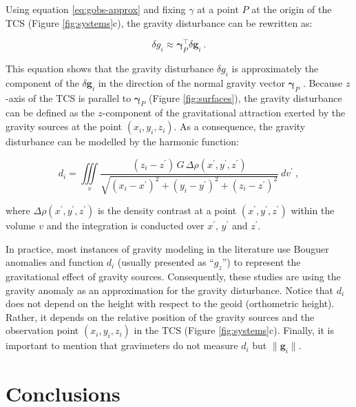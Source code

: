 \documentclass[manuscript]{geophysics}
\begin{document}
Using equation \ref{eq:gobs-approx} and fixing $\gamma$ at a point $P$ at
the origin of the TCS (Figure \ref{fig:systems}c),
the gravity disturbance can be rewritten as:

\begin{equation}
\delta g_{i} \approx \mathbf{\gamma}_{P}^{\top} \delta \mathbf{g}_{i} \: .
\label{eq:gravity-disturbance-approx-TCS}
\end{equation}

\noindent
This equation shows that the gravity disturbance $\delta g_{i}$ is
approximately the component of the $\delta \mathbf{g}_{i}$ in the direction of
the normal gravity vector $\mathbf{\gamma}_P$
\citep{hofmann-wellenhof-moritz2005, sanso_sideris2013}.
Because $z$-axis of the TCS is parallel to $\mathbf{\gamma}_P$
(Figure \ref{fig:surfaces}), the gravity disturbance can be defined as the
$z$-component of the gravitational attraction exerted by the gravity sources at
the point $(x_{i}, y_{i}, z_{i})$.
As a consequence, the gravity disturbance can be modelled by the harmonic
function:

\begin{equation}
d_{i} = \iiint\limits_{v}
\frac{(z_{i} - z^{\prime}) \, G \, \Delta\rho(x^{\prime}, y^{\prime}, z^{\prime})}
{\sqrt{(x_{i} - x^{\prime})^{2} +
		(y_{i} - y^{\prime})^{2} + (z_{i} - z^{\prime})^{2}}} \: dv^{\prime} \: ,
\label{eq:gz-local}
\end{equation}

\noindent
where $\Delta\rho(x^{\prime}, y^{\prime}, z^{\prime})$
is the density contrast at a point $(x^{\prime}, y^{\prime}, z^{\prime})$
within the volume $v$ and the integration is conducted over $x^{\prime}$,
$y^{\prime}$ and $z^{\prime}$.

In practice, most instances of gravity modeling in the literature use Bouguer
anomalies and function $d_{i}$ (usually presented as ``$g_z$'') to represent
the gravitational effect of gravity sources.
Consequently, these studies are using the gravity
anomaly as an approximation for the gravity disturbance.
Notice that $d_{i}$ does not depend on the
height with respect to the geoid (orthometric height).
Rather, it depends on the relative position of the gravity sources and the
observation point $(x_{i}, y_{i}, z_{i})$ in the TCS (Figure \ref{fig:systems}c).
Finally, it is important to mention that gravimeters do not measure $d_{i}$ but
$\| \mathbf{g}_i \|$.


\section{Conclusions}
\end{document}
